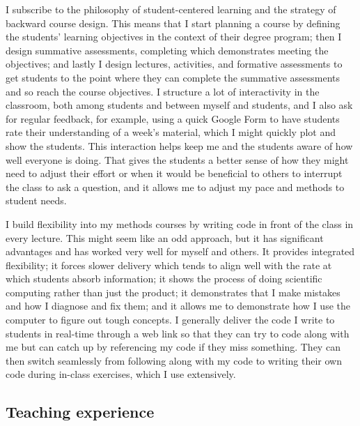 I subscribe to the philosophy of student-centered learning and the
strategy of backward course design. This means that I start planning a
course by defining the students' learning objectives in the context of
their degree program; then I design summative assessments, completing
which demonstrates meeting the objectives; and lastly I design lectures,
activities, and formative assessments to get students to the point where
they can complete the summative assessments and so reach the course
objectives. I structure a lot of interactivity in the classroom, both
among students and between myself and students, and I also ask for
regular feedback, for example, using a quick Google Form to have
students rate their understanding of a week's material, which I might
quickly plot and show the students. This interaction helps keep me and
the students aware of how well everyone is doing. That gives the
students a better sense of how they might need to adjust their effort or
when it would be beneficial to others to interrupt the class to ask a
question, and it allows me to adjust my pace and methods to student
needs. \medskip

I build flexibility into my methods courses by writing code in front of
the class in every lecture. This might seem like an odd approach, but it
has significant advantages and has worked very well for myself and
others. It provides integrated flexibility; it forces slower delivery
which tends to align well with the rate at which students absorb
information; it shows the process of doing scientific computing rather
than just the product; it demonstrates that I make mistakes and how I
diagnose and fix them; and it allows me to demonstrate how I use the
computer to figure out tough concepts. I generally deliver the code I
write to students in real-time through a web link so that they can try
to code along with me but can catch up by referencing my code if they
miss something. They can then switch seamlessly from following along
with my code to writing their own code during in-class exercises, which
I use extensively.

\subsection{Teaching experience}\label{teaching-experience-1}

